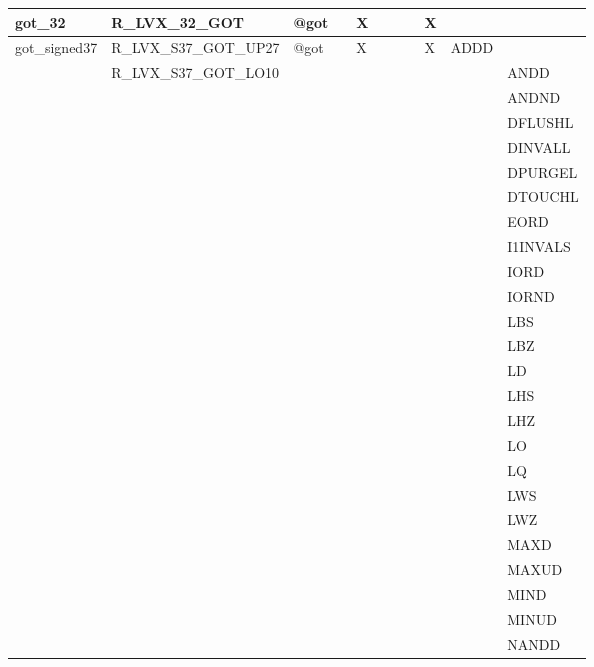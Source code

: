 {\begin{tabular}{|l|l|l|l|l|l|l|l|l|l|l|}
\hline
\textsf{got\_32} & \textsf{R\_LVX\_32\_GOT} & \textsf{@got} & \textsf{} & \textsf{X} & \textsf{} & \textsf{} & \textsf{} & \textsf{X} & \textsf{} \\
\hline
\textsf{got\_signed37} & \textsf{R\_LVX\_S37\_GOT\_UP27} & \textsf{@got} & \textsf{} & \textsf{X} & \textsf{} & \textsf{} & \textsf{} & \textsf{X} & \textsf{ADDD} \\
 & \textsf{R\_LVX\_S37\_GOT\_LO10} & & & & & & & & & \textsf{ANDD} \\
 & & & & & & & & & & \textsf{ANDND} \\
 & & & & & & & & & & \textsf{DFLUSHL} \\
 & & & & & & & & & & \textsf{DINVALL} \\
 & & & & & & & & & & \textsf{DPURGEL} \\
 & & & & & & & & & & \textsf{DTOUCHL} \\
 & & & & & & & & & & \textsf{EORD} \\
 & & & & & & & & & & \textsf{I1INVALS} \\
 & & & & & & & & & & \textsf{IORD} \\
 & & & & & & & & & & \textsf{IORND} \\
 & & & & & & & & & & \textsf{LBS} \\
 & & & & & & & & & & \textsf{LBZ} \\
 & & & & & & & & & & \textsf{LD} \\
 & & & & & & & & & & \textsf{LHS} \\
 & & & & & & & & & & \textsf{LHZ} \\
 & & & & & & & & & & \textsf{LO} \\
 & & & & & & & & & & \textsf{LQ} \\
 & & & & & & & & & & \textsf{LWS} \\
 & & & & & & & & & & \textsf{LWZ} \\
 & & & & & & & & & & \textsf{MAXD} \\
 & & & & & & & & & & \textsf{MAXUD} \\
 & & & & & & & & & & \textsf{MIND} \\
 & & & & & & & & & & \textsf{MINUD} \\
 & & & & & & & & & & \textsf{NANDD} \\
\hline\end{tabular}
}
\smallskip

